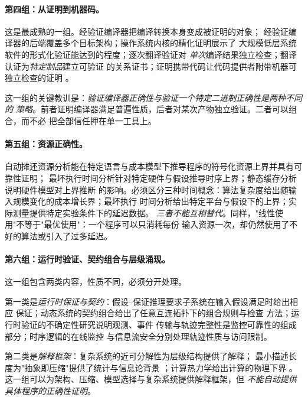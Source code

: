 \paragraph{第四组：从证明到机器码。}
这是最成熟的一组。经验证编译器把编译转换本身变成被证明的对象\cite{leroy2009}；
经验证编译器的后端覆盖多个目标架构\cite{cakeml2019}；操作系统内核的精化证明展示了
大规模低层系统软件的形式化验证能达到的程度\cite{klein2009}；逐次翻译验证对
\emph{单次}编译结果独立检查\cite{necula2000}；翻译认证为\emph{特定制品}建立可验证
的关系证书\cite{krijnen2024}；证明携带代码让代码提供者附带机器可独立检查的证明
\cite{necula1997}。

这一组的关键教训是：\emph{验证编译器正确性与验证一个特定二进制正确性是两种不同的
策略}。前者证明编译器满足普遍性质，后者对某次产物独立验证。二者可以组合，而不必
把全部信任押在单一工具上。

\paragraph{第五组：资源正确性。}
自动摊还资源分析能在特定语言与成本模型下推导程序的符号化资源上界并具有可靠性证明；
最坏执行时间分析针对特定硬件与假设推导时序上界；静态缓存分析说明硬件模型对上界推断
的影响。必须区分三种时间概念：算法复杂度给出随输入规模变化的成本增长界；最坏执行
时间分析给出特定平台与假设下的上界；实际测量提供特定实验条件下的延迟数据。
\emph{三者不能互相替代}。同样，"线性使用"不等于"最优使用"：一个程序可以只消耗每份
输入资源一次，却仍然使用了不好的算法或引入了过多延迟。

\paragraph{第六组：运行时验证、契约组合与层级涌现。}
这一组包含两类内容，性质不同，必须分开处理。

第一类是\emph{运行时保证与契约}：假设--保证推理要求子系统在输入假设满足时给出相应
保证\cite{henzinger1998}；动态系统的契约组合给出了任意互连拓扑下的组合规则与检查
方法\cite{sharf2021,sharf2024,shali2026}；运行时验证的不确定性研究说明观测、事件
传输与轨迹完整性是监控可靠性的组成部分\cite{taleb2023}；时序逻辑的在线监控
\cite{leucker2009}与信息流安全\cite{goguen1982}分别处理轨迹性质与访问限制。

第二类是\emph{解释框架}：复杂系统的近可分解性为层级结构提供了解释\cite{simon1962}；
最小描述长度为"抽象即压缩"提供了统计与信息论背景
\cite{rissanen1978,grunwald2006,grunwald2019}；计算热力学给出计算的物理下界
\cite{landauer1961}。这一组可以为架构、压缩、模型选择与复杂系统提供解释框架，但
\emph{不能自动提供具体程序的正确性证明}。

